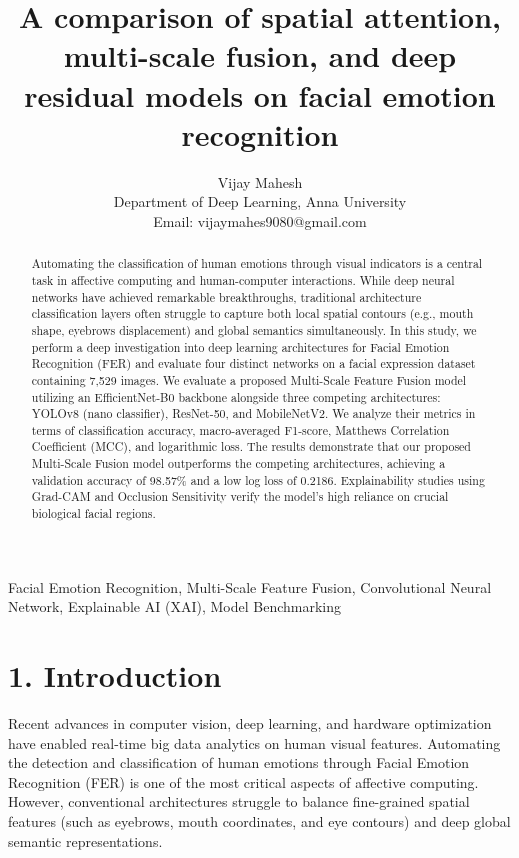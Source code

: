 \documentclass[journal,10pt]{IEEEtran}
\begin{document}
\title{A comparison of spatial attention, multi-scale fusion, and deep residual models on facial emotion recognition}
\author{Vijay Mahesh\\Department of Deep Learning, Anna University\\Email: vijaymahes9080@gmail.com}
\maketitle

\begin{abstract}
Automating the classification of human emotions through visual indicators is a central task in affective computing and human-computer interactions. While deep neural networks have achieved remarkable breakthroughs, traditional architecture classification layers often struggle to capture both local spatial contours (e.g., mouth shape, eyebrows displacement) and global semantics simultaneously. In this study, we perform a deep investigation into deep learning architectures for Facial Emotion Recognition (FER) and evaluate four distinct networks on a facial expression dataset containing 7,529 images. We evaluate a proposed Multi-Scale Feature Fusion model utilizing an EfficientNet-B0 backbone alongside three competing architectures: YOLOv8 (nano classifier), ResNet-50, and MobileNetV2. We analyze their metrics in terms of classification accuracy, macro-averaged F1-score, Matthews Correlation Coefficient (MCC), and logarithmic loss. The results demonstrate that our proposed Multi-Scale Fusion model outperforms the competing architectures, achieving a validation accuracy of 98.57\% and a low log loss of 0.2186. Explainability studies using Grad-CAM and Occlusion Sensitivity verify the model's high reliance on crucial biological facial regions.
\end{abstract}

\begin{IEEEkeywords}
Facial Emotion Recognition, Multi-Scale Feature Fusion, Convolutional Neural Network, Explainable AI (XAI), Model Benchmarking
\end{IEEEkeywords}

\section{1. Introduction}
Recent advances in computer vision, deep learning, and hardware optimization have enabled real-time big data analytics on human visual features. Automating the detection and classification of human emotions through Facial Emotion Recognition (FER) is one of the most critical aspects of affective computing. However, conventional architectures struggle to balance fine-grained spatial features (such as eyebrows, mouth coordinates, and eye contours) and deep global semantic representations. 
\end{document}
